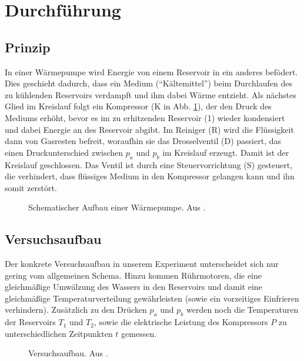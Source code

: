 \section{Durchführung}
\label{sec:Durchführung}
\subsection{Prinzip}
In einer Wärmepumpe wird Energie von einem Reservoir in ein anderes befödert. Dies geschieht dadurch, dass ein Medium (\enquote{Kältemittel}) beim Durchlaufen des zu kühlenden Reservoirs verdampft und ihm dabei Wärme entzieht. Als nächstes Glied im Kreislauf folgt ein Kompressor (K in Abb. \ref{fig:wärmepumpe}), der den Druck des Mediums erhöht, bevor es im zu erhitzenden Reservoir (1) wieder kondensiert und dabei Energie an des Reservoir abgibt. Im Reiniger (R) wird die Flüssigkeit dann von Gasresten befreit, woraufhin sie das Drosselventil (D) passiert, das einen Druckunterschied zwischen $p_a$ und $p_b$ im Kreislauf erzeugt. Damit ist der Kreislauf geschlossen. Das Ventil ist durch eine Steuervorrichtung (S) gesteuert, die verhindert, dass flüssiges Medium in den Kompressor gelangen kann und ihn somit zerstört.

\begin{figure}
  \centering
  \def\svgwidth{\columnwidth}
  
  \caption{Schematischer Aufbau einer Wärmepumpe. Aus \cite{anleitung206}.}
  \label{fig:wärmepumpe}
\end{figure}

\subsection{Versuchsaufbau}
Der konkrete Versuchsaufbau in unserem Experiment unterscheidet sich nur gering vom allgemeinen Schema. Hinzu kommen Rührmotoren, die eine gleichmäßige Umwälzung des Wassers in den Reservoirs und damit eine gleichmäßige Temperaturverteilung gewährleisten (sowie ein vorzeitiges Einfrieren verhindern). Zusätzlich zu den Drücken $p_a$ und $p_b$ werden noch die Temperaturen der Reservoirs $T_{1}$ und $T_{2}$, sowie die elektrische Leistung des Kompressors $P$ zu unterschiedlichen Zeitpunkten $t$ gemessen.

\begin{figure}
  \centering
  
  \caption{Versuchsaufbau. Aus \cite{anleitung206}.}
  \label{fig:aufbau}
\end{figure}
